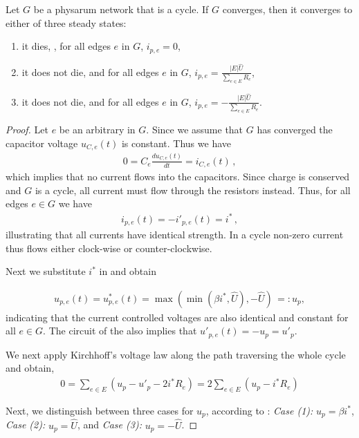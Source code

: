 \begin{lem}\label{lem:ring_cont}
Let $G$ be a physarum network that is a cycle. If $G$ converges, then it converges to either of three steady states:
\begin{enumerate}
\item it dies, \ie, for all edges $e$ in $G$, $i_{p,e}=0$,\label{case:1}
\item it does not die, and for all edges $e$ in $G$, $i_{p,e}=\frac{|E|\hat{U}}{\sum_{e \in E} R_e}$,\label{case:2}
\item it does not die, and for all edges $e$ in $G$, $i_{p,e}=-\frac{|E|\hat{U}}{\sum_{e \in E} R_e}$.\label{case:3}
\end{enumerate}
\end{lem}
\begin{proof}
Let $e$ be an arbitrary \Pe in $G$. Since we assume that $G$ has converged the capacitor voltage $u_{C,e}(t)$ is constant. Thus we have
\begin{align}
0 = C_e\frac{du_{C,e}(t)}{dt} = i_{C,e}(t)\,,
\end{align}
which implies that no current flows into the capacitors. Since charge is conserved and $G$ is a cycle, all current must flow through the resistors instead. Thus, for all edges $e \in G$ we have
\begin{align}
  i_{p,e}(t) = - i'_{p,e}(t) = i^*\,,
\end{align}
illustrating that all currents have identical strength. In a cycle non-zero current thus flows either clock-wise or counter-clockwise. 

Next we substitute $i^*$ in  and obtain

\begin{align}
  u_{p,e}(t) = u^*_{p,e}(t) = \max(\min(\beta i^*,\hat{U}),-\hat{U})\, =: u_p,\label{eq:up}
\end{align}
indicating that the current controlled voltages are also identical and constant for all $e \in G$.
The circuit of the \Pe also implies that $u'_{p,e}(t) = - u_p = u'_p$.

We next apply Kirchhoff's voltage law along the path traversing the whole cycle and obtain,
\begin{align}
0 = \sum_{e \in E} (u_p - u'_p - 2 i^* R_e) = 2\sum_{e \in E} (u_p - i^* R_e)\label{eq:sum1}
\end{align}

Next, we distinguish between three cases for $u_p$, according to : {\em Case (1):} $u_p = \beta i^*$, {\em Case (2):} $u_p = \hat{U}$, and {\em Case (3):} $u_p = -\hat{U}$.


\end{proof}
